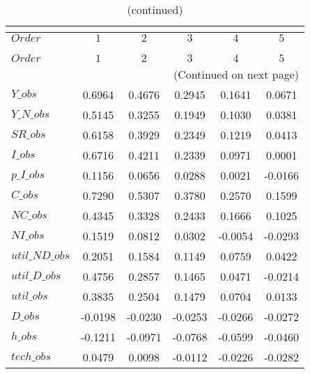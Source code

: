  
\begin{center}
\begin{longtable}{lccccc} 
\caption{COEFFICIENTS OF AUTOCORRELATION}\\
 \label{Table:th_autocorr_matrix}\\
\toprule 
$Order          $	 & 	 $          1$	 & 	 $          2$	 & 	 $          3$	 & 	 $          4$	 & 	 $          5$\\
\midrule \endfirsthead 
\caption{(continued)}\\
 \toprule \\ 
$Order          $	 & 	 $          1$	 & 	 $          2$	 & 	 $          3$	 & 	 $          4$	 & 	 $          5$\\
\midrule \endhead 
\midrule \multicolumn{6}{r}{(Continued on next page)} \\ \bottomrule \endfoot 
\bottomrule \endlastfoot 
$Y\_obs         $	 & 	     0.6964	 & 	     0.4676	 & 	     0.2945	 & 	     0.1641	 & 	     0.0671 \\ 
$Y\_N\_obs      $	 & 	     0.5145	 & 	     0.3255	 & 	     0.1949	 & 	     0.1030	 & 	     0.0381 \\ 
$SR\_obs        $	 & 	     0.6158	 & 	     0.3929	 & 	     0.2349	 & 	     0.1219	 & 	     0.0413 \\ 
$I\_obs         $	 & 	     0.6716	 & 	     0.4211	 & 	     0.2339	 & 	     0.0971	 & 	     0.0001 \\ 
$p\_I\_obs      $	 & 	     0.1156	 & 	     0.0656	 & 	     0.0288	 & 	     0.0021	 & 	    -0.0166 \\ 
$C\_obs         $	 & 	     0.7290	 & 	     0.5307	 & 	     0.3780	 & 	     0.2570	 & 	     0.1599 \\ 
$NC\_obs        $	 & 	     0.4345	 & 	     0.3328	 & 	     0.2433	 & 	     0.1666	 & 	     0.1025 \\ 
$NI\_obs        $	 & 	     0.1519	 & 	     0.0812	 & 	     0.0302	 & 	    -0.0054	 & 	    -0.0293 \\ 
$util\_ND\_obs  $	 & 	     0.2051	 & 	     0.1584	 & 	     0.1149	 & 	     0.0759	 & 	     0.0422 \\ 
$util\_D\_obs   $	 & 	     0.4756	 & 	     0.2857	 & 	     0.1465	 & 	     0.0471	 & 	    -0.0214 \\ 
$util\_obs      $	 & 	     0.3835	 & 	     0.2504	 & 	     0.1479	 & 	     0.0704	 & 	     0.0133 \\ 
$D\_obs         $	 & 	    -0.0198	 & 	    -0.0230	 & 	    -0.0253	 & 	    -0.0266	 & 	    -0.0272 \\ 
$h\_obs         $	 & 	    -0.1211	 & 	    -0.0971	 & 	    -0.0768	 & 	    -0.0599	 & 	    -0.0460 \\ 
$tech\_obs      $	 & 	     0.0479	 & 	     0.0098	 & 	    -0.0112	 & 	    -0.0226	 & 	    -0.0282 \\ 
\end{longtable}
 \end{center}
